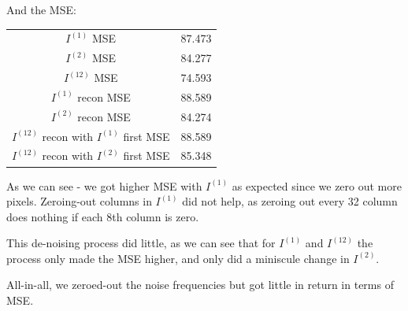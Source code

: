 \documentclass[english]{extarticle}
\numberwithin{equation}{section}
\numberwithin{figure}{section}
\begin{document}
\newpage
And the MSE:

\begin{table}[h]
    \centering
    \begin{tabular}{c|c}
        $I^{(1)}$ MSE & 87.473 \\
        $I^{(2)}$ MSE & 84.277 \\
        $I^{(12)}$ MSE & 74.593 \\
        $I^{(1)}$ recon MSE & 88.589 \\
        $I^{(2)}$ recon MSE & 84.274 \\
        $I^{(12)}$ recon with $I^{(1)}$ first MSE & 88.589 \\
        $I^{(12)}$ recon with $I^{(2)}$ first MSE & 85.348
    \end{tabular}
\end{table}

As we can see - we got higher MSE with $I^{(1)}$ as expected since we zero out more pixels.
Zeroing-out columns in $I^{(1)}$ did not help, as zeroing out every 32 column does nothing if each 8th column is zero.

This de-noising process did little, as we can see that for $I^{(1)}$ and $I^{(12)}$ the process only made the MSE higher, and only did a miniscule change in $I^{(2)}$.

All-in-all, we zeroed-out the noise frequencies but got little in return in terms of MSE.
\end{document}
